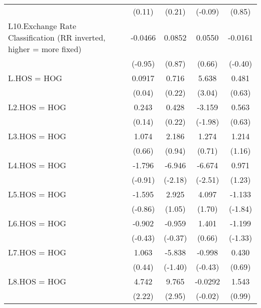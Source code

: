 {\begin{longtable}{l*{4}{c}}
                &   (0.11)         &   (0.21)         &  (-0.09)         &   (0.85)         \\
[1em]
L10.Exchange Rate Classification (RR inverted, higher = more fixed)&  -0.0466         &   0.0852         &   0.0550         &  -0.0161         \\
                &  (-0.95)         &   (0.87)         &   (0.66)         &  (-0.40)         \\
[1em]
L.HOS = HOG     &   0.0917         &    0.716         &    5.638\sym{**} &    0.481         \\
                &   (0.04)         &   (0.22)         &   (3.04)         &   (0.63)         \\
[1em]
L2.HOS = HOG    &    0.243         &    0.428         &   -3.159\sym{*}  &    0.563         \\
                &   (0.14)         &   (0.22)         &  (-1.98)         &   (0.63)         \\
[1em]
L3.HOS = HOG    &    1.074         &    2.186         &    1.274         &    1.214         \\
                &   (0.66)         &   (0.94)         &   (0.71)         &   (1.16)         \\
[1em]
L4.HOS = HOG    &   -1.796         &   -6.946\sym{*}  &   -6.674\sym{*}  &    0.971         \\
                &  (-0.91)         &  (-2.18)         &  (-2.51)         &   (1.23)         \\
[1em]
L5.HOS = HOG    &   -1.595         &    2.925         &    4.097         &   -1.133         \\
                &  (-0.86)         &   (1.05)         &   (1.70)         &  (-1.84)         \\
[1em]
L6.HOS = HOG    &   -0.902         &   -0.959         &    1.401         &   -1.199         \\
                &  (-0.43)         &  (-0.37)         &   (0.66)         &  (-1.33)         \\
[1em]
L7.HOS = HOG    &    1.063         &   -5.838         &   -0.998         &    0.430         \\
                &   (0.44)         &  (-1.40)         &  (-0.43)         &   (0.69)         \\
[1em]
L8.HOS = HOG    &    4.742\sym{*}  &    9.765\sym{**} &  -0.0292         &    1.543         \\
                &   (2.22)         &   (2.95)         &  (-0.02)         &   (0.99)         \\

\end{longtable}}
